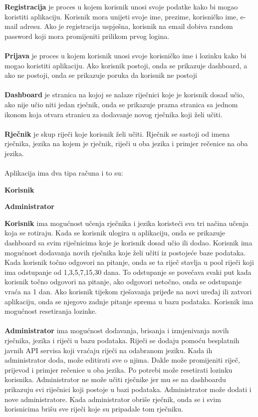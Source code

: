 		\textbf{Registracija} je proces u kojem korisnik unosi svoje podatke kako bi mogao koristiti aplikaciju.
		Korisnik mora unijeti svoje ime, prezime, korisničko ime, e-mail adresu.
		Ako je registracija uspješna, korisnik na email dobiva random password koji mora promijeniti prilikom prvog logina.
		\\
		\\
		\textbf{Prijava} je proces u kojem korisnik unosi svoje korisničko ime i lozinku kako bi mogao koristiti aplikaciju.
		Ako korisnik postoji, onda se prikazuje dashboard, a ako ne postoji, onda se prikazuje poruka da korisnik ne postoji
		\\
		\\
		\textbf{Dashboard} je stranica na kojoj se nalaze riječnici koje je korisnik dosad učio, ako nije učio niti jedan rječnik, onda se prikazuje prazna stranica sa jednom ikonom koja otvara stranicu za dodavanje novog rječnika koji želi učiti.
		\\
		\\
		\textbf{Rječnik} je skup riječi koje korisnik želi učiti.
		Rječnik se sastoji od imena rječnika, jezika na kojem je rječnik, riječi u oba jezika i primjer rečenice na oba jezika.
		\\
		\\
		Aplikacija ima dva tipa računa i to su:
		\begin{packed_item}
			\item \textbf{Korisnik} 
			\item \textbf{Administrator}
		\end{packed_item}

		\textbf{Korisnik} ima mogućnost učenja rječnika i jezika koristeći sva tri načina učenja koja se rotiraju.
		Kada se korisnik ulogira u aplikaciju, onda se prikazuje dashboard sa svim riječnicima koje je korisnik dosad učio ili dodao.
		Korisnik ima mogućnost dodavanja novih rječnika koje želi učiti iz postojeće baze podataka.
		Kada korisnik točno odgovori na pitanje, onda se ta riječ stavlja u pool riječi koji ima odstupanje od 1,3,5,7,15,30 dana.
		To odstupanje se povečava svaki put kada korisnik točno odgovori na pitanje, ako odgovori netočno, onda se odstupanje vraća na 1 dan.
		Ako korisnik tijekom rješavanja prijeđe na novi uređaj ili zatvori aplikaciju, onda se njegovo zadnje pitanje sprema u bazu podataka.
		Korisnik ima mogućnost resetiranja lozinke.
		\\
		\\
		\textbf{Administrator} ima mogućnost dodavanja, brisanja i izmjenivanja novih rječnika, jezika i riječi u bazu podataka.
		Riječi se dodaju pomoću besplatnih javnih API servisa koji vraćaju riječi na odabranom jeziku. Kada ih administrator doda, može editirati sve o njima.
		Dakle može promijeniti riječ, prijevod i primjer rečenice u oba jezika.
		Po potrebi može resetirati lozinku korisnika.
		Administrator ne može učiti rječnike jer mu se na dashboardu prikazuju svi riječnici koji postoje u bazi podataka.
		Administrator može dodati i nove administratore. Kada administrator obriše rječnik, onda se i svim korisnicima brišu sve riječi koje su pripadale tom rječniku.
		\\
		\\

		\eject
		
	
